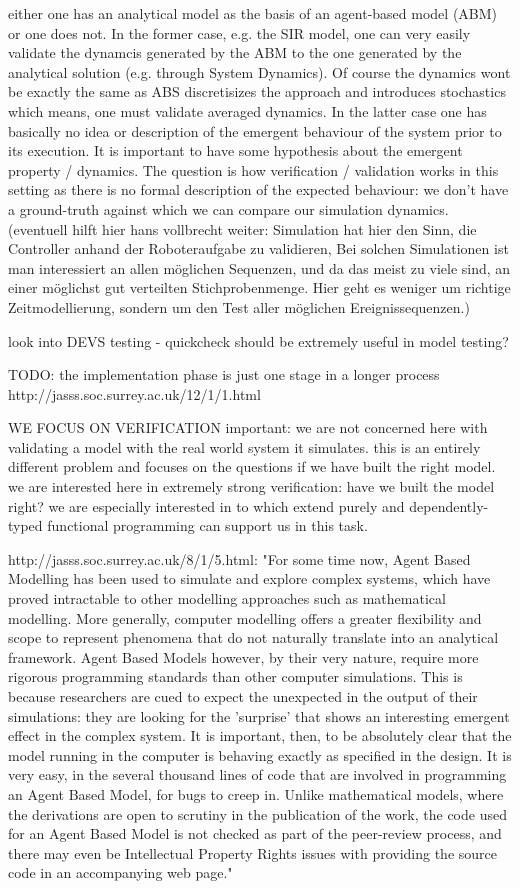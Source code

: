 either one has an analytical model as the basis of an agent-based model (ABM) or one does not.
In the former case, e.g. the SIR model, one can very easily validate the dynamcis generated by the ABM to the one generated by the analytical solution (e.g. through System Dynamics). Of course the dynamics wont be exactly the same as ABS discretisizes the approach and introduces stochastics which means, one must validate averaged dynamics.
In the latter case one has basically no idea or description of the emergent behaviour of the system prior to its execution. It is important to have some hypothesis about the emergent property / dynamics. The question is how verification / validation works in this setting as there is no formal description of the expected behaviour: we don't have a ground-truth against which we can compare our simulation dynamics. (eventuell hilft hier hans vollbrecht weiter: Simulation hat hier den Sinn, die Controller anhand der Roboteraufgabe zu validieren, Bei solchen Simulationen ist man interessiert an allen möglichen Sequenzen, und da das meist zu viele sind, an einer möglichst gut verteilten Stichprobenmenge. Hier geht es weniger um richtige Zeitmodellierung, sondern um den Test aller möglichen Ereignissequenzen.)

look into DEVS
testing
- quickcheck should be extremely useful in model testing?

TODO: the implementation phase is just one stage in a longer process http://jasss.soc.surrey.ac.uk/12/1/1.html

WE FOCUS ON VERIFICATION
important: we are not concerned here with validating a model with the real world system it simulates. this is an entirely different problem and focuses on the questions if we have built the right model.
we are interested here in extremely strong verification: have we built the model right? we are especially interested in to which extend purely and dependently-typed functional programming can support us in this task.

http://jasss.soc.surrey.ac.uk/8/1/5.html: "For some time now, Agent Based Modelling has been used to simulate and explore complex systems, which have proved intractable to other modelling approaches such as mathematical modelling. More generally, computer modelling offers a greater flexibility and scope to represent phenomena that do not naturally translate into an analytical framework. Agent Based Models however, by their very nature, require more rigorous programming standards than other computer simulations. This is because researchers are cued to expect the unexpected in the output of their simulations: they are looking for the 'surprise' that shows an interesting emergent effect in the complex system. It is important, then, to be absolutely clear that the model running in the computer is behaving exactly as specified in the design. It is very easy, in the several thousand lines of code that are involved in programming an Agent Based Model, for bugs to creep in. Unlike mathematical models, where the derivations are open to scrutiny in the publication of the work, the code used for an Agent Based Model is not checked as part of the peer-review process, and there may even be Intellectual Property Rights issues with providing the source code in an accompanying web page."

